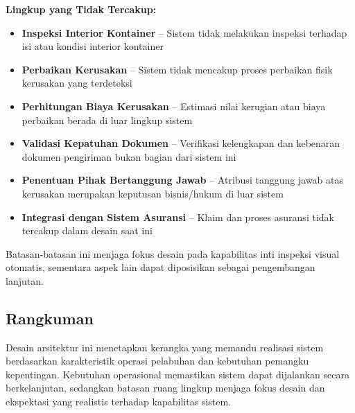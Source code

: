 \textbf{Lingkup yang Tidak Tercakup:}
\begin{itemize}
  \item \textbf{Inspeksi Interior Kontainer} -- Sistem tidak melakukan inspeksi terhadap isi atau kondisi interior kontainer
  \item \textbf{Perbaikan Kerusakan} -- Sistem tidak mencakup proses perbaikan fisik kerusakan yang terdeteksi
  \item \textbf{Perhitungan Biaya Kerusakan} -- Estimasi nilai kerugian atau biaya perbaikan berada di luar lingkup sistem
  \item \textbf{Validasi Kepatuhan Dokumen} -- Verifikasi kelengkapan dan kebenaran dokumen pengiriman bukan bagian dari sistem ini
  \item \textbf{Penentuan Pihak Bertanggung Jawab} -- Atribusi tanggung jawab atas kerusakan merupakan keputusan bisnis/hukum di luar sistem
  \item \textbf{Integrasi dengan Sistem Asuransi} -- Klaim dan proses asuransi tidak tercakup dalam desain saat ini
\end{itemize}

Batasan-batasan ini menjaga fokus desain pada kapabilitas inti inspeksi visual otomatis, sementara aspek lain dapat diposisikan sebagai pengembangan lanjutan.

\subsection{Rangkuman}

Desain arsitektur ini menetapkan kerangka yang memandu realisasi sistem berdasarkan karakteristik operasi pelabuhan dan kebutuhan pemangku kepentingan. Kebutuhan operasional memastikan sistem dapat dijalankan secara berkelanjutan, sedangkan batasan ruang lingkup menjaga fokus desain dan ekspektasi yang realistis terhadap kapabilitas sistem.
